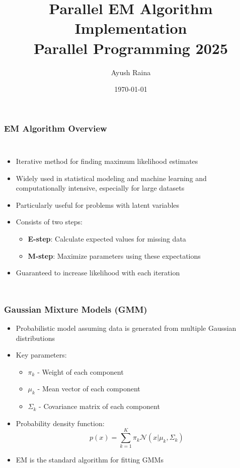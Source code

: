 \documentclass{beamer}
\title{Parallel EM Algorithm Implementation \\ Parallel Programming 2025}
\author{Ayush Raina}
\date{\today}
\begin{document}
\begin{frame}
    \titlepage
\end{frame}

\begin{frame}
    \frametitle{EM Algorithm Overview}
    \begin{columns}
    \begin{itemize}
        \item Iterative method for finding maximum likelihood estimates
        \item Widely used in statistical modeling and machine learning and computationally intensive, especially for large datasets
        \item Particularly useful for problems with latent variables
        \item Consists of two steps:
        \begin{itemize}
            \item \textbf{E-step}: Calculate expected values for missing data
            \item \textbf{M-step}: Maximize parameters using these expectations
        \end{itemize}
        \item Guaranteed to increase likelihood with each iteration
    \end{itemize}
    \end{columns}
\end{frame}

\begin{frame}
    \frametitle{Gaussian Mixture Models (GMM)}
    \begin{itemize}
        \item Probabilistic model assuming data is generated from multiple Gaussian distributions
        \item Key parameters:
        \begin{itemize}
            \item $\pi_k$ - Weight of each component
            \item $\mu_k$ - Mean vector of each component
            \item $\Sigma_k$ - Covariance matrix of each component
        \end{itemize}
        \item Probability density function:
        \begin{equation}
            p(x) = \sum_{k=1}^{K} \pi_k \mathcal{N}(x|\mu_k,\Sigma_k)
        \end{equation}
        \item EM is the standard algorithm for fitting GMMs
    \end{itemize}
\end{frame}
\end{document}
